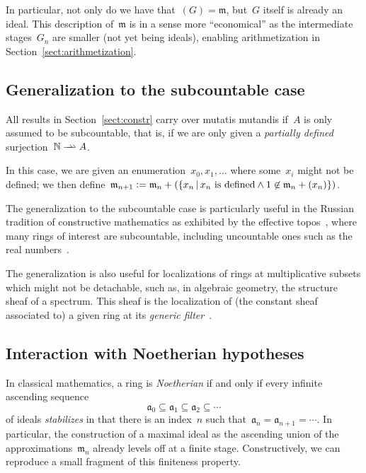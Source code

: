 \documentclass[com,11pt,crcready]{iosart2x}
\theoremstyle{definition}
\theoremstyle{plain}
\theoremstyle{remark}
\newcommand{\aaa}{\mathfrak{a}}
\newcommand{\mmm}{\mathfrak{m}}
\newcommand{\NN}{\mathbb{N}}
\newcommand{\defeq}{\vcentcolon=}
\renewcommand{\_}{\mathpunct{.}\,}
\begin{document}
In particular, not only do we have that~$(G) = \mmm$, but~$G$ itself is already
an ideal. This description of~$\mmm$ is in a sense more ``economical'' as the
intermediate stages~$G_n$ are smaller (not yet being ideals), enabling
arithmetization in Section~\ref{sect:arithmetization}.


\subsection{Generalization to the subcountable case}
\label{sect:subcountable}

\newcommand{\rightrightharpoonup}{\mathrel{\mathrlap{\rightharpoonup}\mkern1mu\rightharpoonup}}
All results in Section~\ref{sect:constr} carry over mutatis mutandis if~$A$ is
only assumed to be subcountable, that is, if we are only
given a \emph{partially defined} surjection~$\NN \rightrightharpoonup A$.

In
this case, we are given an enumeration~$x_0,x_1,\ldots$ where some~$x_i$
might not be defined; we then define~$\mmm_{n+1} \defeq
\mmm_n + (\{ x_n \,|\, \text{$x_n$ is defined} \wedge 1 \not\in \mmm_n + (x_n) \})$.

The generalization to the subcountable case is particularly useful in the
Russian tradition of constructive mathematics as exhibited by the ef{}fective
topos~\cite{hyland:effective-topos,oosten:realizability,phoa:effective,bauer:c2c},
where many rings of interest are subcountable, including uncountable ones such as the real
numbers~\cite[Prop.~7.2]{hyland:effective-topos}.

The generalization is also useful for
localizations of rings at multiplicative subsets which might not be detachable,
such as, in algebraic geometry, the structure sheaf of a spectrum. This sheaf
is the localization of (the constant sheaf associated to) a given ring at its
\emph{generic filter}~\cite[Section~3.3]{blechschmidt:generalized-spaces}.


\subsection{Interaction with Noetherian hypotheses}

In classical mathematics, a ring is \emph{Noetherian} if and only if every
infinite ascending sequence
\[ \aaa_0 \subseteq \aaa_1 \subseteq \aaa_2 \subseteq \cdots \]
of ideals \emph{stabilizes} in that there is an index~$n$ such that~$\aaa_n =
\aaa_{n+1} = \cdots$. In particular, the construction of a maximal ideal as the
ascending union of the approximations~$\mmm_n$ already levels off at a finite
stage. Constructively, we can reproduce a small fragment of this
finiteness property.
\end{document}

